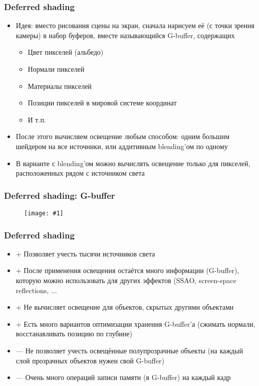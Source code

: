 \documentclass{beamer}
\newcommand{\slideimage}[1]{
  \begin{figure}
    \begin{adjustbox}{width=\textwidth, totalheight=\textheight-2\baselineskip-2\baselineskip,keepaspectratio}
      \texttt{[image: \#1]}
    \end{adjustbox}
  \end{figure}
}
\begin{document}
\begin{frame}[fragile]
\frametitle{Deferred shading}
\begin{itemize}
\item Идея: вместо рисования сцены на экран, сначала нарисуем её (с точки зрения камеры) в набор буферов, вместе называющийся G-buffer, содержащих
\begin{itemize}
\item Цвет пикселей (альбедо)
\item Нормали пикселей
\item Материалы пикселей
\item Позиции пикселей в мировой системе координат
\item И т.п.
\end{itemize}
\pause
\item После этого вычисляем освещение любым способом: одним большим шейдером на все источники, или аддитивным blending'ом по одному
\pause
\item В варианте с blending'ом можно вычислять освещение только для пикселей, расположенных рядом с источником света
\end{itemize}
\end{frame}

\begin{frame}[fragile]
\frametitle{Deferred shading: G-buffer}
\slideimage{g_buffer.png}
\end{frame}

\begin{frame}[fragile]
\frametitle{Deferred shading}
\begin{itemize}
\item {\color{green}+} Позволяет учесть тысячи источников света
\item {\color{green}+} После применения освещения остаётся много информации (G-buffer), которую можно использовать для других эффектов (SSAO, screen-space reflections, ...
\item {\color{green}+} Не вычисляет освещение для объектов, скрытых другими объектами
\item {\color{green}+} Есть много вариантов оптимизации хранения G-buffer'а (сжимать нормали, восстанавливать позицию по глубине)
\item {\color{red}—} Не позволяет учесть освещённые полупрозрачные объекты (на каждый слой прозрачных объектов нужен свой G-buffer)
\item {\color{red}—} Очень много операций записи памяти (в G-buffer) на каждый кадр
\end{itemize}
\end{frame}
\end{document}
